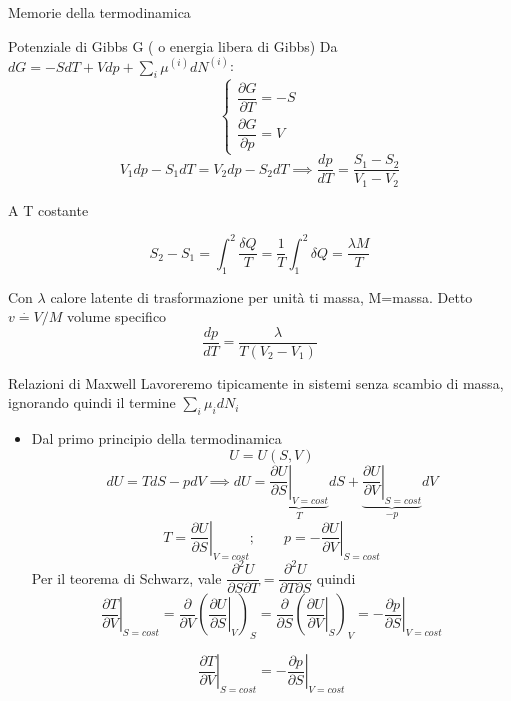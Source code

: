 \documentclass[a4paper,11pt]{report}
\newcommand{\defeq}{\overset{\cdot}{=}}
\begin{document}
\begin{chapter}{Memorie della termodinamica}
\begin{section}{Potenziale di Gibbs G ( o energia libera di Gibbs)}
		Da $dG = -SdT + Vdp + \sum_i \mu^{(i)} dN^{(i)}$:
		$$
		\left\{\begin{matrix}
		\dfrac{\partial G}{\partial T} = -S \\ 
		\dfrac{\partial G}{\partial p} = V 
		\end{matrix}\right.
		$$
		\begin{equation}
			V_1 dp -S_1 dT = V_2 dp - S_2 dT \implies \dfrac{dp}{dT} = \dfrac{S_1 - S_2}{V_1 - V_2}
		\end{equation}
		
		A T costante
		
		\begin{equation}
			S_2 - S_1 = \int_{1}^{2}\dfrac{\delta Q}{T} = \dfrac{1}{T} \int_{1}^{2} \delta Q = \dfrac{\lambda M}{T}
		\end{equation}
		
		Con $\lambda$ calore latente di trasformazione per unità ti massa, M=massa. Detto $v \defeq V/M$ volume specifico
		\begin{equation}
			\dfrac{dp}{dT} = \dfrac{\lambda}{T(V_2 - V_1)}
		\end{equation}
	\end{section}
	\begin{section}{Relazioni di Maxwell}
		Lavoreremo tipicamente in sistemi senza scambio di massa, ignorando quindi il termine $\sum_i \mu_i dN_i$
		\begin{itemize}
		\item Dal primo principio della termodinamica
		$$
		U=U(S,V)
		$$
		$$
		dU = TdS - pdV \implies dU =\underset{T}{ \underbrace{\left.\dfrac{\partial U}{\partial S}\right|_{V=cost}}}dS +  \underset{-p}{\underbrace{\left.\dfrac{\partial U}{\partial V}\right|_{S=cost}}}dV
		$$
		$$
		T= \left.\dfrac{\partial U}{\partial S}\right|_{V=cost}; \qquad p= -  \left.\dfrac{\partial U}{\partial V}\right|_{S=cost}
		$$
		Per il teorema di Schwarz, vale $\dfrac{\partial^2 U}{\partial S\partial T} = \dfrac{\partial^2 U}{\partial T \partial S} $ quindi
		$$
		\left.\dfrac{\partial T}{\partial V}\right|_{S=cost} = \dfrac{\partial}{\partial V}\left( \left.\dfrac{\partial U}{\partial S}\right|_V \right)_S = 
		\dfrac{\partial}{\partial S}\left( \left.\dfrac{\partial U}{\partial V} \right|_S \right)_V = - \left.\dfrac{\partial p}{\partial S}\right|_{V=cost}
		$$
		
		\begin{equation}
			\left.\dfrac{\partial T}{\partial V}\right|_{S=cost} = - \left.\dfrac{\partial p}{\partial S}\right|_{V=cost}
		\end{equation}
		

\end{itemize}
\end{section}
\end{chapter}
\end{document}
